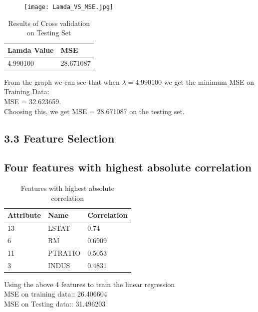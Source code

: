 \documentclass[12pt]{article}
\begin{document}
\begin{figure}[h]
\texttt{[image: Lamda\_VS\_MSE.jpg]}
\centering
\end{figure}
\newpage
\begin{table}[t]
\centering
\caption{ Results of Cross validation on Testing Set}
\label{CV Result}
\begin{tabular}{|l|l|}
\hline
\textbf{Lamda Value} & \textbf{MSE} \\ \hline
4.990100               & 28.671087    \\ \hline
\end{tabular}
\end{table}
From the graph we can see that when $ \lambda = 4.990100 $ we get the minimum MSE on Training Data:\\ MSE = 32.623659.\\
Choosing this, we get MSE = 28.671087 on the testing set.
\subsection*{3.3 Feature Selection}
\subsection{ Four features with highest absolute correlation}
\begin{table}[h]
\centering
\caption{Features with highest absolute correlation}
\label{4_correlation}
\begin{tabular}{|l|l|l|}
\hline
\textbf{Attribute} & \textbf{Name} & \textbf{Correlation} \\ \hline
13                 & LSTAT         & 0.74                 \\ \hline
6                  & RM            & 0.6909               \\ \hline
11                 & PTRATIO       & 0.5053               \\ \hline
3                  & INDUS         & 0.4831               \\ \hline
\end{tabular}
\end{table}
Using the above 4 features to train the linear regression\\
MSE on training data:: 26.406604\\
MSE on Testing data:: 31.496203\\
\end{document}
